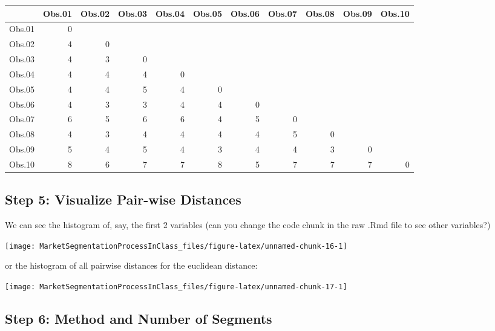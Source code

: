 \documentclass[
]{article}
\begin{document}
\begin{center}
\begin{longtable}{lrrrrrrrrrr}
\toprule
  & Obs.01 & Obs.02 & Obs.03 & Obs.04 & Obs.05 & Obs.06 & Obs.07 & Obs.08 & Obs.09 & Obs.10\\
\midrule
Obs.01 & 0 &  &  &  &  &  &  &  &  & \\
Obs.02 & 4 & 0 &  &  &  &  &  &  &  & \\
Obs.03 & 4 & 3 & 0 &  &  &  &  &  &  & \\
Obs.04 & 4 & 4 & 4 & 0 &  &  &  &  &  & \\
Obs.05 & 4 & 4 & 5 & 4 & 0 &  &  &  &  & \\
\addlinespace
Obs.06 & 4 & 3 & 3 & 4 & 4 & 0 &  &  &  & \\
Obs.07 & 6 & 5 & 6 & 6 & 4 & 5 & 0 &  &  & \\
Obs.08 & 4 & 3 & 4 & 4 & 4 & 4 & 5 & 0 &  & \\
Obs.09 & 5 & 4 & 5 & 4 & 3 & 4 & 4 & 3 & 0 & \\
Obs.10 & 8 & 6 & 7 & 7 & 8 & 5 & 7 & 7 & 7 & 0\\
\bottomrule
\end{longtable}\end{center}

\hypertarget{step-5-visualize-pair-wise-distances}{%
\subsection{Step 5: Visualize Pair-wise
Distances}\label{step-5-visualize-pair-wise-distances}}

We can see the histogram of, say, the first 2 variables (can you change
the code chunk in the raw .Rmd file to see other variables?)

\begin{center}\texttt{[image: MarketSegmentationProcessInClass\_files/figure-latex/unnamed-chunk-16-1]} \end{center}

or the histogram of all pairwise distances for the euclidean distance:

\begin{center}\texttt{[image: MarketSegmentationProcessInClass\_files/figure-latex/unnamed-chunk-17-1]} \end{center}

\hypertarget{step-6-method-and-number-of-segments}{%
\subsection{Step 6: Method and Number of
Segments}\label{step-6-method-and-number-of-segments}}
\end{document}
